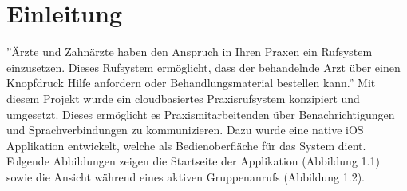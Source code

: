 \section{Einleitung}

''Ärzte und Zahnärzte haben den Anspruch in Ihren Praxen ein Rufsystem einzusetzen.
Dieses Rufsystem ermöglicht, dass der behandelnde Arzt über einen Knopfdruck Hilfe anfordern oder Behandlungsmaterial bestellen kann.''\cite{aufgabenstellung}
Mit diesem Projekt wurde ein cloudbasiertes Praxisrufsystem konzipiert und umgesetzt.
Dieses ermöglicht es Praxismitarbeitenden über Benachrichtigungen und Sprachverbindungen zu kommunizieren.
Dazu wurde eine native iOS Applikation entwickelt, welche als Bedienoberfläche für das System dient.
Folgende Abbildungen zeigen die Startseite der Applikation (Abbildung 1.1) sowie die Ansicht während eines aktiven Gruppenanrufs (Abbildung 1.2).

